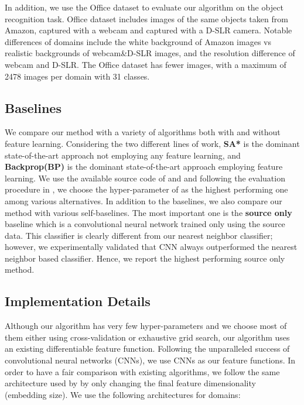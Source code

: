 In addition, we use the Office\cite{office} dataset to evaluate our algorithm on the object recognition task. Office dataset includes images of the same objects taken from Amazon, captured with a webcam and captured with a D-SLR camera. Notable differences of domains include the white background of Amazon images vs realistic backgrounds of webcam\&D-SLR images, and the resolution difference of webcam and D-SLR. The Office dataset has fewer images, with a maximum of 2478 images per domain with 31 classes. %


\vspace{-2mm}
\subsection{Baselines}
We compare our method with a variety of algorithms both with and without feature learning. Considering the two different lines of work, \textbf{SA*}\cite{fernando13} is the dominant state-of-the-art approach not employing any feature learning, and \textbf{Backprop(BP)}\cite{ganin15} is the dominant state-of-the-art approach employing feature learning. We use the available source code of \cite{ganin15} and \cite{fernando13} and following the evaluation procedure in \cite{ganin15}, we choose the hyper-parameter of \cite{fernando13} as the highest performing one among various alternatives. In addition to the baselines, we also compare our method with various self-baselines. The most important one is the \textbf{source only} baseline which is a convolutional neural network trained only using the source data. This classifier is clearly different from our nearest neighbor classifier; however, we experimentally validated that CNN always outperformed the nearest neighbor based classifier. Hence, we report the highest performing source only method.

\vspace{-2mm}
\subsection{Implementation Details}
\label{imp_det}
Although our algorithm has very few hyper-parameters and we choose most of them either using cross-validation or exhaustive grid search, our algorithm uses an existing differentiable feature function. Following the unparalleled success of convolutional neural networks (CNNs), we use CNNs as our feature functions.  In order to have a fair comparison with existing algorithms, we follow the same architecture used by \cite{ganin15} by only changing the final feature dimensionality (embedding size). We use the following architectures for domains:

